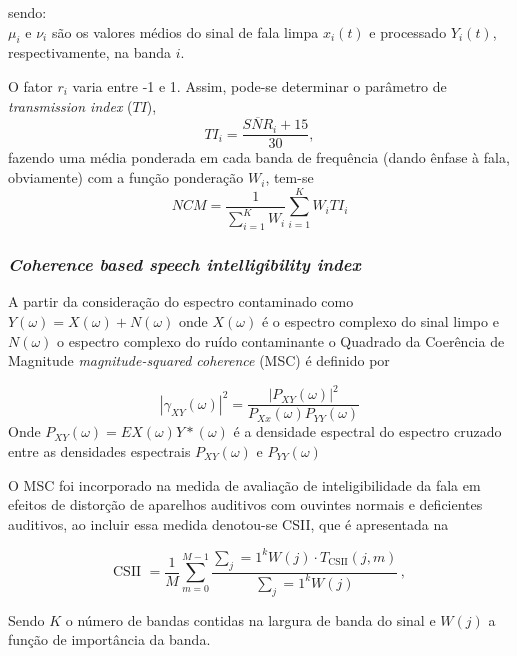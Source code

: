 \noindent
sendo:\\
$\mu_i$ e $\nu_i$ são os valores médios do sinal de fala limpa $x_i(t)$ e processado $Y_i(t)$, respectivamente, na banda $i$. 

O fator $r_i$ varia entre -1 e 1. Assim, pode-se determinar o parâmetro de \textit{transmission index} ($TI$), 
\begin{equation}
    TI_i = \frac{\overline{SNR}_i + 15}{30}, 
\end{equation}
\noindent
 fazendo uma média ponderada em cada banda de frequência (dando ênfase à fala, obviamente) com a função ponderação $W_i$, tem-se
\begin{equation}
    NCM = \frac{1}{\sum_{i=1}^{K} W_i}\sum_{i=1}^{K} W_iTI_i
\end{equation}

\subsubsection{\textit{Coherence based speech intelligibility index}}

A partir da consideração do espectro contaminado como $Y(\omega) = X(\omega)+N(\omega)$ onde $X(\omega)$ é o espectro complexo do sinal limpo e $N(\omega)$ o espectro complexo do ruído contaminante o Quadrado da Coerência de Magnitude \textit{magnitude-squared coherence}  (MSC) é definido por

\begin{equation}
    |\gamma_{XY}(\omega)|^2 = \dfrac{|P_{XY}(\omega)|^2}{P_{Xx}(\omega)P_{YY}(\omega)}
    \label{msceq}
\end{equation}
\noindent
Onde $P_{XY}(\omega) = EX(\omega)Y* (\omega)$ é a densidade espectral do espectro cruzado entre as densidades espectrais $P_{XY}(\omega)$ e $P_{YY}(\omega)$

O MSC foi incorporado na medida de avaliação de inteligibilidade da fala em efeitos de distorção  de aparelhos auditivos com ouvintes normais e deficientes auditivos, ao incluir essa medida denotou-se CSII, que é apresentada na 

\begin{equation}
    \text{CSII } = \dfrac{1}{M}\sum\limits_{m=0}^{M-1}\dfrac{\sum_j=1^kW(j)\cdot T_{\text{CSII}}(j,m)}{\sum_j=1^kW(j)} \,,
    \label{eqCSII}
\end{equation}
\noindent

Sendo $K$ o número de bandas contidas na largura de banda do sinal e $W(j)$ a função de importância da banda.

